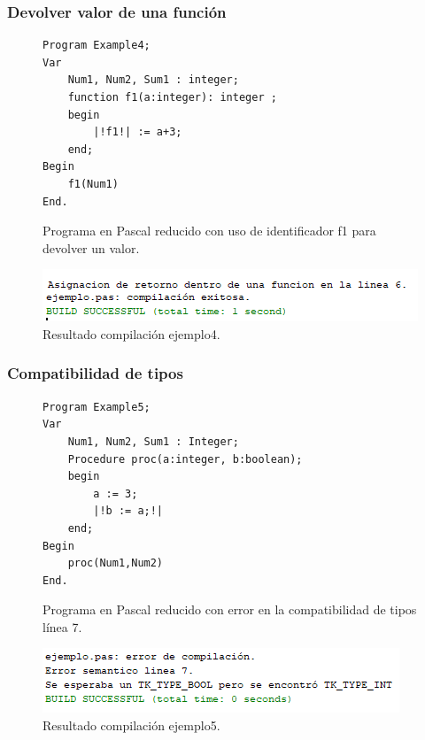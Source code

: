 \subsubsection{Devolver valor de una función}
\begin{figure}[H]
\begin{verbatim}
Program Example4;
Var       
    Num1, Num2, Sum1 : integer;
    function f1(a:integer): integer ;
    begin
        |!f1!| := a+3;
    end;
Begin
    f1(Num1)
End.
\end{verbatim}
\caption{Programa en Pascal reducido con uso de identificador f1 para devolver un valor.}
\label{fig:semantico_ej_error_4}
\end{figure}

\begin{figure}[H]
\centering
\includegraphics[]{img/semantico/semantico_ej4.png}
\caption{Resultado compilación ejemplo4.}
\label{fig:semantico_ej4}
\end{figure}

\subsubsection{Compatibilidad de tipos}

\begin{figure}[H]
\begin{verbatim}
Program Example5;
Var       
    Num1, Num2, Sum1 : Integer;
    Procedure proc(a:integer, b:boolean);
    begin
        a := 3;
        |!b := a;!|
    end;
Begin
    proc(Num1,Num2)
End.
\end{verbatim}
\caption{Programa en Pascal reducido con error en la compatibilidad de tipos línea 7.}
\label{fig:semantico_ej_error_5}
\end{figure}

\begin{figure}[H]
\centering
\includegraphics[]{img/semantico/semantico_ej5.png}
\caption{Resultado compilación ejemplo5.}
\label{fig:semantico_ej5}
\end{figure}

